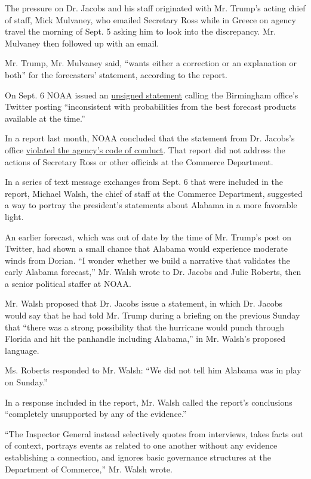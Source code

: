 The pressure on Dr. Jacobs and his staff originated with Mr. Trump's
acting chief of staff, Mick Mulvaney, who emailed Secretary Ross while
in Greece on agency travel the morning of Sept. 5 asking him to look
into the discrepancy. Mr. Mulvaney then followed up with an email.

Mr. Trump, Mr. Mulvaney said, ``wants either a correction or an
explanation or both'' for the forecasters' statement, according to the
report.

On Sept. 6 NOAA issued an
\href{https://www.nytimes.com/2019/09/06/us/politics/trump-alabama-dorian.html}{unsigned
statement} calling the Birmingham office's Twitter posting
``inconsistent with probabilities from the best forecast products
available at the time.''

In a report last month, NOAA concluded that the statement from Dr.
Jacobs's office
\href{https://www.nytimes.com/2020/06/15/climate/noaa-sharpiegate-ethics-violation.html}{violated
the agency's code of conduct}. That report did not address the actions
of Secretary Ross or other officials at the Commerce Department.

In a series of text message exchanges from Sept. 6 that were included in
the report, Michael Walsh, the chief of staff at the Commerce
Department, suggested a way to portray the president's statements about
Alabama in a more favorable light.

An earlier forecast, which was out of date by the time of Mr. Trump's
post on Twitter, had shown a small chance that Alabama would experience
moderate winds from Dorian. ``I wonder whether we build a narrative that
validates the early Alabama forecast,'' Mr. Walsh wrote to Dr. Jacobs
and Julie Roberts, then a senior political staffer at NOAA.

Mr. Walsh proposed that Dr. Jacobs issue a statement, in which Dr.
Jacobs would say that he had told Mr. Trump during a briefing on the
previous Sunday that ``there was a strong possibility that the hurricane
would punch through Florida and hit the panhandle including Alabama,''
in Mr. Walsh's proposed language.

Ms. Roberts responded to Mr. Walsh: ``We did not tell him Alabama was in
play on Sunday.''

In a response included in the report, Mr. Walsh called the report's
conclusions ``completely unsupported by any of the evidence.''

``The Inspector General instead selectively quotes from interviews,
takes facts out of context, portrays events as related to one another
without any evidence establishing a connection, and ignores basic
governance structures at the Department of Commerce,'' Mr. Walsh wrote.

